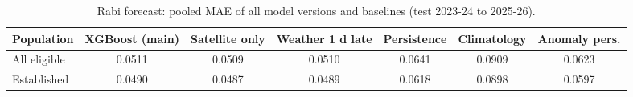 \begin{table}[H]
\centering
\caption{Rabi forecast: pooled MAE of all model versions and baselines (test 2023-24 to 2025-26).}
\label{tab:r_versions}
\footnotesize
\begin{tabular}{@{}lcccccc@{}}
\toprule
\textbf{Population} & \textbf{XGBoost (main)} & \textbf{Satellite only} & \textbf{Weather 1 d late} & \textbf{Persistence} & \textbf{Climatology} & \textbf{Anomaly pers.} \\
\midrule
All eligible & 0.0511 & 0.0509 & 0.0510 & 0.0641 & 0.0909 & 0.0623 \\
Established & 0.0490 & 0.0487 & 0.0489 & 0.0618 & 0.0898 & 0.0597 \\
\bottomrule
\end{tabular}
\end{table}
